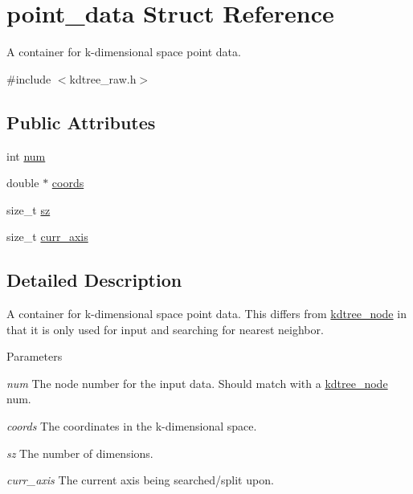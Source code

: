 \hypertarget{structpoint__data}{
\section{point\_\-data Struct Reference}
\label{structpoint__data}
}


A container for k-\/dimensional space point data.  




{\ttfamily \#include $<$kdtree\_\-raw.h$>$}

\subsection*{Public Attributes}
\begin{DoxyCompactItemize}
\item 
int \hyperlink{structpoint__data_ad644f53aa795445d1f8e2a96f5bbffcd}{num}
\item 
double $\ast$ \hyperlink{structpoint__data_adf36d0d155b6f048bf8b238f6f382852}{coords}
\item 
size\_\-t \hyperlink{structpoint__data_a0a8a39666c3f29a7ba173e05637798d7}{sz}
\item 
size\_\-t \hyperlink{structpoint__data_ab4fdf1640319330eaaa312dc128d15f4}{curr\_\-axis}
\end{DoxyCompactItemize}


\subsection{Detailed Description}
A container for k-\/dimensional space point data. This differs from \hyperlink{structkdtree__node}{kdtree\_\-node} in that it is only used for input and searching for nearest neighbor. 
\begin{DoxyParams}{Parameters}
\item[{\em num}]The node number for the input data. Should match with a \hyperlink{structkdtree__node}{kdtree\_\-node} num. \item[{\em coords}]The coordinates in the k-\/dimensional space. \item[{\em sz}]The number of dimensions. \item[{\em curr\_\-axis}]The current axis being searched/split upon. \end{DoxyParams}


